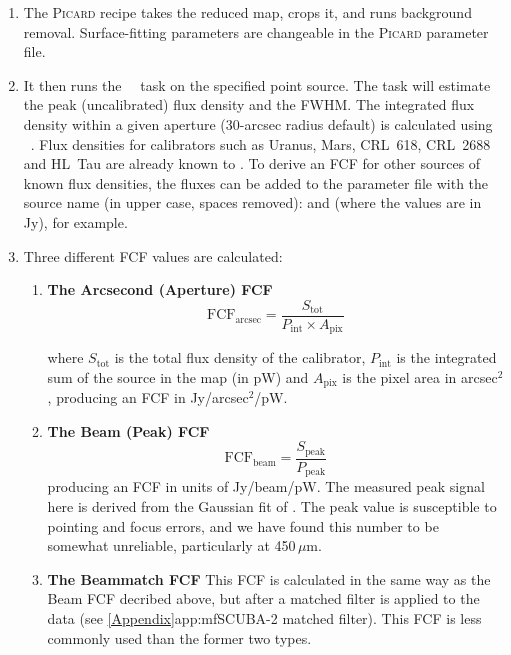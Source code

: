 \begin{enumerate}
\item The \textsc{Picard} recipe  takes the
  reduced map, crops it, and runs background removal. Surface-fitting
  parameters are changeable in the \textsc{Picard} parameter file.

\item It then runs the \Kappa\ \beamfit\ task on the specified point
  source. The  task will estimate the peak
  (uncalibrated) flux density and the FWHM. The integrated flux
  density within a given aperture (30-arcsec radius default) is
  calculated using \photom\ \autophotom. Flux densities for
  calibrators such as Uranus, Mars, CRL~618, CRL~2688 and HL~Tau are
  already known to \picard. To derive an FCF for other sources of
  known flux densities, the fluxes can be added to the parameter file
  with the source name (in upper case, spaces
  removed): 
  and  (where the values are in Jy),
  for example.

\item Three different FCF values are calculated:

  \begin{enumerate}

  \item \textbf{The Arcsecond (Aperture) FCF}
    \begin{equation}
      \label{eq:fcf_arcsec}
      \mathrm{FCF_{arcsec}} = \frac{S_{\mathrm{tot}}}{P_{\mathrm{int}} \times
        A_{\mathrm{pix}}}
    \end{equation}

    where $S_{\mathrm{tot}}$ is the total flux density of the
    calibrator, $P_{\mathrm{int}}$ is the integrated sum of the source
    in the map (in pW) and $A_{\mathrm{pix}}$ is the pixel area in
    arcsec$^2$, producing an FCF in Jy/arcsec$^2$/pW.

   \vspace{3mm}

  \item\textbf{The Beam (Peak) FCF}
    \begin{equation}
      \label{eq:fcf_beam}
      \mathrm{FCF_{beam}} = \frac{S_{\mathrm{peak}}}{P_{\mathrm{peak}}}
    \end{equation}
    producing an FCF in units of Jy/beam/pW. The measured peak signal here is
    derived from the Gaussian fit of . The peak value is susceptible
    to pointing and focus errors, and we have found this number to be somewhat unreliable,
    particularly at 450\,$\mu$m.

   \vspace{3mm}

  \item\textbf{The Beammatch FCF}
    This FCF is calculated in the same way as the Beam FCF decribed
    above, but after a matched filter is applied to the data (see
    \cref{Appendix}{app:mf}{SCUBA-2 matched filter}).
    This FCF is less commonly used than the former two types.

  \end{enumerate}

\end{enumerate}

